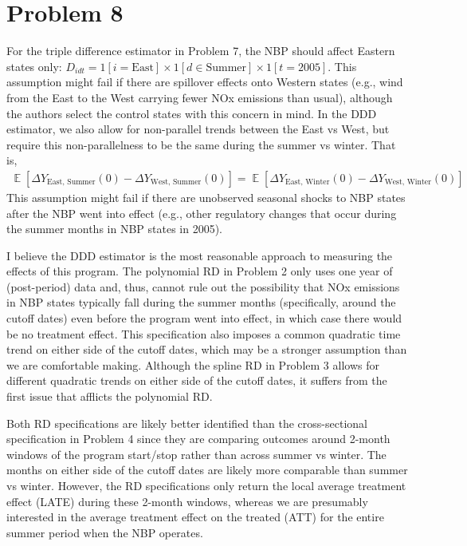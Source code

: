 \documentclass[12pt]{article}
\DeclareMathOperator{\EX}{\mathbb{E}}%
\begin{document}
\section*{Problem 8}
For the triple difference estimator in Problem 7, the NBP should affect Eastern states only: $D_{idt} = 1[i=\text{East}] \times 1[d \in \text{Summer}] \times 1[t=2005]$. This assumption might fail if there are spillover effects onto Western states (e.g., wind from the East to the West carrying fewer NOx emissions than usual), although the authors select the control states with this concern in mind. In the DDD estimator, we also allow for non-parallel trends between the East vs West, but require this non-parallelness to be the same during the summer vs winter. That is,
\begin{align*}
	\EX[\Delta Y_{\text{East, Summer}}(0) - \Delta Y_{\text{West, Summer}}(0)] = \EX[\Delta Y_{\text{East, Winter}}(0) - \Delta Y_{\text{West, Winter}}(0)]
\end{align*}
This assumption might fail if there are unobserved seasonal shocks to NBP states after the NBP went into effect (e.g., other regulatory changes that occur during the summer months in NBP states in 2005). 

I believe the DDD estimator is the most reasonable approach to measuring the effects of this
program. The polynomial RD in Problem 2 only uses one year of (post-period) data and, thus, cannot rule out the possibility that NOx emissions in NBP states typically fall during the summer months (specifically, around the cutoff dates) even before the program went into effect, in which case there would be no treatment effect. This specification also imposes a common quadratic time trend on either side of the cutoff dates, which may be a stronger assumption than we are comfortable making. Although the spline RD in Problem 3 allows for different quadratic trends on either side of the cutoff dates, it suffers from the first issue that afflicts the polynomial RD. 

Both RD specifications are likely better identified than the cross-sectional specification in Problem 4 since they are comparing outcomes around 2-month windows of the program start/stop rather than across summer vs winter. The months on either side of the cutoff dates are likely more comparable than summer vs winter. However, the RD specifications only return the local average treatment effect (LATE) during these 2-month windows, whereas we are presumably interested in the average treatment effect on the treated (ATT) for the entire summer period when the NBP operates.
\end{document}
